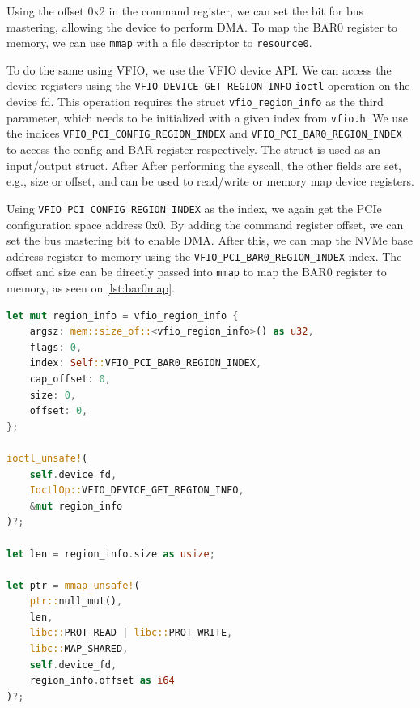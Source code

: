 Using the offset 0x2 in the command register, we can set the bit for bus mastering, allowing the device to perform DMA.
To map the BAR0 register to memory, we can use \texttt{mmap} with a file descriptor to \texttt{resource0}.

To do the same using VFIO, we use the VFIO device API.
We can access the device registers using the \texttt{VFIO\_DEVICE\_GET\_REGION\_INFO} \texttt{ioctl} operation on the device fd. This operation requires the struct \texttt{vfio\_region\_info} as the third parameter, which needs to be initialized with a given index from \texttt{vfio.h}.
We use the indices \texttt{VFIO\_PCI\_CONFIG\_REGION\_INDEX} and \texttt{VFIO\_PCI\_BAR0\_REGION\_INDEX} to access the config and BAR register respectively. The struct is used as an input/output struct. After
After performing the syscall, the other fields are set, e.g., size or offset, and can be used to read/write or memory map device registers.

Using \texttt{VFIO\_PCI\_CONFIG\_REGION\_INDEX} as the index, we again get the PCIe configuration space address 0x0. By adding the command register offset, we can set the bus mastering bit to enable DMA.
After this, we can map the NVMe base address register to memory using the \texttt{VFIO\_PCI\_BAR0\_REGION\_INDEX} index.
The offset and size can be directly passed into \texttt{mmap} to map the BAR0 register to memory, as seen on \autoref{lst:bar0map}.

\begin{minipage}{.95\linewidth}
    \begin{lstlisting}[language=Rust,caption={Mapping the BAR0 NVMe register to memory}, label=lst:bar0map]
let mut region_info = vfio_region_info {
    argsz: mem::size_of::<vfio_region_info>() as u32,
    flags: 0,
    index: Self::VFIO_PCI_BAR0_REGION_INDEX,
    cap_offset: 0,
    size: 0,
    offset: 0,
};

ioctl_unsafe!(
    self.device_fd,
    IoctlOp::VFIO_DEVICE_GET_REGION_INFO,
    &mut region_info
)?;

let len = region_info.size as usize;

let ptr = mmap_unsafe!(
    ptr::null_mut(),
    len,
    libc::PROT_READ | libc::PROT_WRITE,
    libc::MAP_SHARED,
    self.device_fd,
    region_info.offset as i64
)?; 
\end{lstlisting}
\end{minipage}

